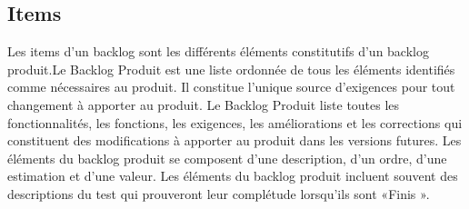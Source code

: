 \subsection{Items}


Les items d'un backlog sont les différents éléments constitutifs d'un backlog produit.Le Backlog Produit est une liste ordonnée de tous les éléments identifiés comme nécessaires au produit. Il constitue l’unique source d'exigences pour tout changement à apporter au produit. Le Backlog Produit liste toutes les fonctionnalités, les fonctions, les exigences, les améliorations et les corrections qui constituent des modifications à apporter au produit dans les versions futures. Les éléments du backlog produit se composent d'une description, d'un ordre, d'une
estimation et d'une valeur. Les éléments du backlog produit incluent souvent des descriptions du test qui prouveront leur complétude lorsqu’ils sont «Finis ».
